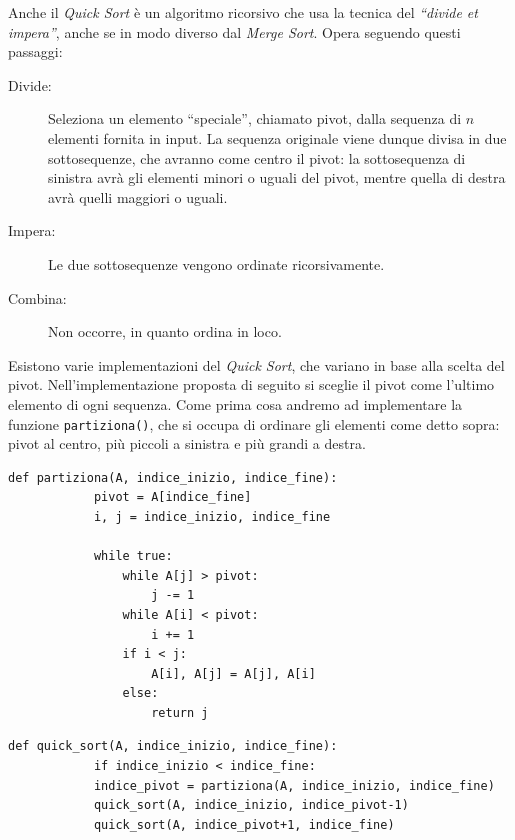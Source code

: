 \documentclass[12pt]{report}
\begin{document}
    Anche il \textit{Quick Sort} è un algoritmo ricorsivo che usa la tecnica del \textit{``divide et impera''}, anche se in modo diverso dal \textit{Merge Sort}. Opera seguendo questi passaggi:
    \begin{description}
    	\item[Divide:] Seleziona un elemento ``speciale'', chiamato pivot, dalla sequenza di $n$ elementi fornita in input. La sequenza originale viene dunque divisa in due sottosequenze, che avranno come centro il pivot: la sottosequenza di sinistra avrà gli elementi minori o uguali del pivot, mentre quella di destra avrà quelli maggiori o uguali.
    	\item[Impera:] Le due sottosequenze vengono ordinate ricorsivamente.
    	\item[Combina:] Non occorre, in quanto ordina in loco.
    \end{description}
    
    Esistono varie implementazioni del \textit{Quick Sort}, che variano in base alla scelta del pivot. Nell'implementazione proposta di seguito si sceglie il pivot come l'ultimo elemento di ogni sequenza. Come prima cosa andremo ad implementare la funzione \texttt{partiziona()}, che si occupa di ordinare gli elementi come detto sopra: pivot al centro, più piccoli a sinistra e più grandi a destra.
    
        \begin{lstlisting}[caption={Funzione ausiliaria "partiziona"}]
    	def partiziona(A, indice_inizio, indice_fine):
    		pivot = A[indice_fine]
    		i, j = indice_inizio, indice_fine
    		
    		while true:
    			while A[j] > pivot:
    				j -= 1
    			while A[i] < pivot:
    				i += 1
    			if i < j:
    				A[i], A[j] = A[j], A[i]
    			else:
    				return j
    \end{lstlisting}
    
    \begin{lstlisting}[caption={Quick Sort}]
    	def quick_sort(A, indice_inizio, indice_fine):
    		if indice_inizio < indice_fine:
    		indice_pivot = partiziona(A, indice_inizio, indice_fine)
    		quick_sort(A, indice_inizio, indice_pivot-1)
    		quick_sort(A, indice_pivot+1, indice_fine)
    \end{lstlisting}
    
\end{document}
